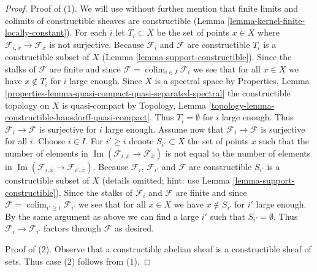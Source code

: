\documentclass[10pt,a4paper]{amsart}
\theoremstyle{plain}
\theoremstyle{definition}
\theoremstyle{remark}
\numberwithin{equation}{subsection}
\def\colim{\mathop{\mathrm{colim}}\nolimits}
\def\Im{\mathop{\mathrm{Im}}}
\begin{document}
\begin{proof}
Proof of (1). We will use without further mention that finite limits
and colimits of constructible sheaves are constructible
(Lemma \ref{lemma-kernel-finite-locally-constant}).
For each $i$ let $T_i \subset X$ be the set of points $x \in X$
where $\mathcal{F}_{i, \overline{x}} \to \mathcal{F}_{\overline{x}}$
is not surjective. Because $\mathcal{F}_i$ and $\mathcal{F}$ are
constructible $T_i$ is a constructible subset of $X$
(Lemma \ref{lemma-support-constructible}).
Since the stalks of $\mathcal{F}$ are finite
and since $\mathcal{F} = \colim_{i \in I} \mathcal{F}_i$ we see
that for all $x \in X$ we have $x \not \in T_i$ for $i$ large enough.
Since $X$ is a spectral space by Properties, Lemma
\ref{properties-lemma-quasi-compact-quasi-separated-spectral}
the constructible topology on $X$ is quasi-compact by
Topology, Lemma \ref{topology-lemma-constructible-hausdorff-quasi-compact}.
Thus $T_i = \emptyset$ for $i$ large enough. Thus
$\mathcal{F}_i \to \mathcal{F}$ is surjective for $i$ large enough.
Assume now that $\mathcal{F}_i \to \mathcal{F}$ is surjective for all $i$.
Choose $i \in I$. For $i' \geq i$ denote $S_{i'} \subset X$ the set of
points $x$ such that the number of elements in
$\Im(\mathcal{F}_{i, \overline{x}} \to \mathcal{F}_{\overline{x}})$
is not equal to the number of elements in
$\Im(\mathcal{F}_{i, \overline{x}} \to \mathcal{F}_{i', \overline{x}})$.
Because $\mathcal{F}_i$, $\mathcal{F}_{i'}$ and $\mathcal{F}$ are
constructible $S_{i'}$ is a constructible subset of $X$
(details omitted; hint: use Lemma \ref{lemma-support-constructible}).
Since the stalks of $\mathcal{F}_i$ and $\mathcal{F}$
are finite and since $\mathcal{F} = \colim_{i' \geq i} \mathcal{F}_{i'}$
we see that for all $x \in X$ we have $x \not \in S_{i'}$ for $i'$
large enough. By the same argument as above we can find a large $i'$ such
that $S_{i'} = \emptyset$. Thus $\mathcal{F}_i \to \mathcal{F}_{i'}$
factors through $\mathcal{F}$ as desired.

\medskip\noindent
Proof of (2). Observe that a constructible abelian sheaf is a constructible
sheaf of sets. Thus case (2) follows from (1).


\end{proof}
\end{document}
